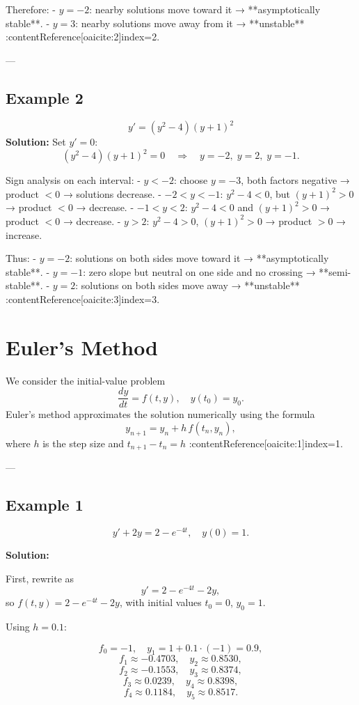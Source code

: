 \documentclass[12pt]{book}
\begin{document}
Therefore:
- \(y = -2\): nearby solutions move toward it → **asymptotically stable**.
- \(y = 3\): nearby solutions move away from it → **unstable** :contentReference[oaicite:2]{index=2}.

---

\subsection*{Example 2}
\[
y' = (y^2 - 4)(y + 1)^2
\]
\textbf{Solution:}
Set \(y' = 0\):
\[
(y^2 - 4)(y + 1)^2 = 0
\quad\Longrightarrow\quad
y = -2,\; y = 2,\; y = -1.
\]

Sign analysis on each interval:
- \(y < -2\): choose \(y = -3\), both factors negative → product \(<0\) → solutions decrease.
- \(-2 < y < -1\): \(y^2 - 4 < 0\), but \((y + 1)^2 > 0\) → product \(<0\) → decrease.
- \(-1 < y < 2\): \(y^2 - 4 < 0\) and \((y + 1)^2 > 0\) → product \(<0\) → decrease.
- \(y > 2\): \(y^2 - 4 > 0\), \((y + 1)^2 > 0\) → product \(>0\) → increase.

Thus:
- \(y = -2\): solutions on both sides move toward it → **asymptotically stable**.
- \(y = -1\): zero slope but neutral on one side and no crossing → **semi-stable**.
- \(y = 2\): solutions on both sides move away → **unstable** :contentReference[oaicite:3]{index=3}.


\section{Euler’s Method}

We consider the initial-value problem
\[
\frac{dy}{dt} = f(t, y), \quad y(t_0) = y_0.
\]
Euler’s method approximates the solution numerically using the formula
\[
y_{n+1} = y_n + h\,f(t_n, y_n),
\]
where \(h\) is the step size and \(t_{n+1} - t_n = h\) :contentReference[oaicite:1]{index=1}.

---

\subsection*{Example 1}

\[
y' + 2y = 2 - e^{-4t}, \quad y(0) = 1.
\]

\textbf{Solution:}

First, rewrite as
\[
y' = 2 - e^{-4t} - 2y,
\]
so \(f(t, y) = 2 - e^{-4t} - 2y\), with initial values \(t_0=0\), \(y_0=1\).

Using \(h = 0.1\):

\[
f_0 = -1, \quad y_1 = 1 + 0.1 \cdot (-1) = 0.9,
\]
\[
f_1 \approx -0.4703, \quad y_2 \approx 0.8530,
\]
\[
f_2 \approx -0.1553, \quad y_3 \approx 0.8374,
\]
\[
f_3 \approx 0.0239, \quad y_4 \approx 0.8398,
\]
\[
f_4 \approx 0.1184, \quad y_5 \approx 0.8517.
\]
\end{document}
